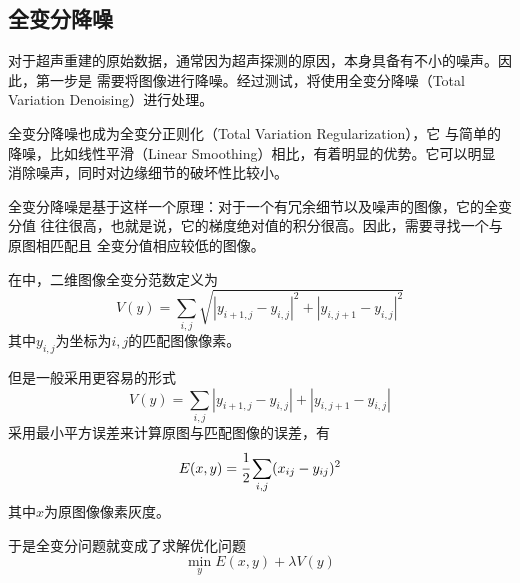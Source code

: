 \subsection{全变分降噪}
对于超声重建的原始数据，通常因为超声探测的原因，本身具备有不小的噪声。因此，第一步是
需要将图像进行降噪。经过测试，将使用全变分降噪（Total Variation Denoising）进行处理。

全变分降噪也成为全变分正则化（Total Variation Regularization），它
与简单的降噪，比如线性平滑（Linear Smoothing）相比，有着明显的优势。它可以明显
消除噪声，同时对边缘细节的破坏性比较小\cite{strong2003edge}。

全变分降噪是基于这样一个原理：对于一个有冗余细节以及噪声的图像，它的全变分值
往往很高，也就是说，它的梯度绝对值的积分很高。因此，需要寻找一个与原图相匹配且
全变分值相应较低的图像\cite{rudin1992nonlinear}。

在\cite{rudin1992nonlinear}中，二维图像全变分范数定义为
\begin{equation*}
V(y)=\sum_{i,j}\sqrt{|y_{i+1,j}-y_{i,j}|^2+|y_{i,j+1}-y_{i,j}|^2}
\end{equation*}
其中$y_{i,j}$为坐标为$i,j$的匹配图像像素。

但是一般采用更容易的形式
\begin{equation*}
V(y)=\sum_{i,j}|y_{i+1,j}-y_{i,j}|+|y_{i,j+1}-y_{i,j}|
\end{equation*}
采用最小平方误差来计算原图与匹配图像的误差，有
\begin{equation*}
E(x,y)=\cfrac{1}{2}\sum_{i,j}(x_{ij}-y_{ij})^2
\end{equation*}
其中$x$为原图像像素灰度。

于是全变分问题就变成了求解优化问题
\begin{equation*}
\min_yE(x,y)+\lambda V(y)
\end{equation*}

